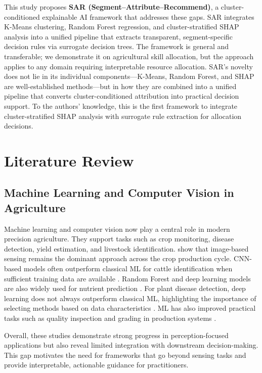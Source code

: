 \documentclass[3p,twocolumn,authoryear]{elsarticle}
\begin{document}
This study proposes \textbf{SAR (Segment--Attribute--Recommend)}, a cluster-conditioned explainable AI framework that addresses these gaps. SAR integrates K-Means clustering, Random Forest regression, and cluster-stratified SHAP analysis into a unified pipeline that extracts transparent, segment-specific decision rules via surrogate decision trees. The framework is general and transferable; we demonstrate it on agricultural skill allocation, but the approach applies to any domain requiring interpretable resource allocation. SAR's novelty does not lie in its individual components---K-Means, Random Forest, and SHAP are well-established methods---but in how they are combined into a unified pipeline that converts cluster-conditioned attribution into practical decision support. To the authors' knowledge, this is the first framework to integrate cluster-stratified SHAP analysis with surrogate rule extraction for allocation decisions.

\section{Literature Review}

\subsection{Machine Learning and Computer Vision in Agriculture}

Machine learning and computer vision now play a central role in modern precision
agriculture. They support tasks such as crop monitoring, disease detection,
yield estimation, and livestock identification. \citet{ghazal2024survey} show
that image-based sensing remains the dominant approach across the crop
production cycle. CNN-based models often outperform classical ML for cattle
identification when sufficient training data are available \citep{hossain2022cattle}.
Random Forest and deep learning models are also widely used for nutrient
prediction \citep{ennaji2023nutrient}. For plant disease detection, deep
learning does not always outperform classical ML, highlighting the importance of
selecting methods based on data characteristics \citep{omaye2024disease}. ML has
also improved practical tasks such as quality inspection and grading in
production systems \citep{wonggasem2024}.

Overall, these studies demonstrate strong progress in perception-focused
applications but also reveal limited integration with downstream decision-making.
This gap motivates the need for frameworks that go beyond sensing tasks and
provide interpretable, actionable guidance for practitioners.
\end{document}
